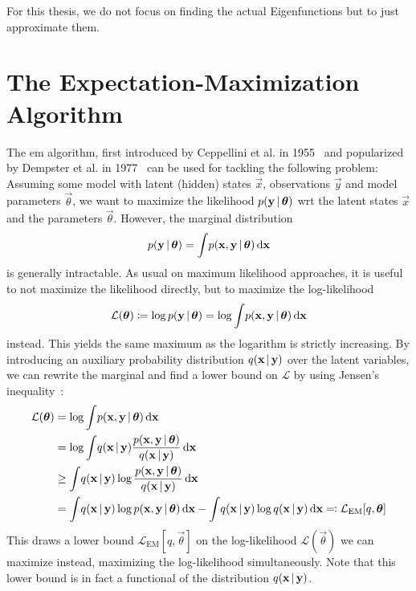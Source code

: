 	For this thesis, we do not focus on finding the actual Eigenfunctions but to just approximate them.

\section{The Expectation-Maximization Algorithm}
	The \ac{em} algorithm, first introduced by Ceppellini et al. in 1955~\cite{ceppelliniEstimationGeneFrequencies1955} and popularized by Dempster et al. in 1977~\cite{dempsterMaximumLikelihoodIncomplete1977a} can be used for tackling the following problem: Assuming some model with latent (hidden) states \(\vec{x}\), observations \(\vec{y}\) and model parameters \(\vec{\theta}\), we want to maximize the likelihood \( p(\boldsymbol{\mathrm{y}} \,\vert\, \boldsymbol{\mathrm{\theta}}) \) \ac{wrt} the latent states \(\vec{x}\) and the parameters \(\vec{\theta}\). However, the marginal distribution
	\begin{align*}
		p(\boldsymbol{\mathrm{y}} \,\vert\, \boldsymbol{\mathrm{\theta}}) = \int\! p(\boldsymbol{\mathrm{x}}, \boldsymbol{\mathrm{y}} \,\vert\, \boldsymbol{\mathrm{\theta}}) \dd{\boldsymbol{\mathrm{x}}}
	\end{align*}
	is generally intractable. As usual on maximum likelihood approaches, it is useful to not maximize the likelihood directly, but to maximize the log-likelihood
	\begin{align*}
		\mathcal{L}(\boldsymbol{\mathrm{\theta}}) \coloneqq \log p(\boldsymbol{\mathrm{y}} \,\vert\, \boldsymbol{\mathrm{\theta}}) = \log \int\! p(\boldsymbol{\mathrm{x}}, \boldsymbol{\mathrm{y}} \,\vert\, \boldsymbol{\mathrm{\theta}}) \dd{\boldsymbol{\mathrm{x}}}
	\end{align*}
	instead. This yields the same maximum as the logarithm is strictly increasing. By introducing an auxiliary probability distribution \( q(\boldsymbol{\mathrm{x}} \,\vert\, \boldsymbol{\mathrm{y}}) \) over the latent variables, we can rewrite the marginal and find a lower bound on \(\mathcal{L}\) by using Jensen's inequality~\cite{jensenFonctionsConvexesInegalites1906}:
	\begin{align}
		\mathcal{L}(\boldsymbol{\mathrm{\theta}})
			&= \log \int\! p(\boldsymbol{\mathrm{x}}, \boldsymbol{\mathrm{y}} \,\vert\, \boldsymbol{\mathrm{\theta}}) \dd{\boldsymbol{\mathrm{x}}}  \nonumber \\
			&= \log \int\! q(\boldsymbol{\mathrm{x}} \,\vert\, \boldsymbol{\mathrm{y}}) \frac{p(\boldsymbol{\mathrm{x}}, \boldsymbol{\mathrm{y}} \,\vert\, \boldsymbol{\mathrm{\theta}})}{q(\boldsymbol{\mathrm{x}} \,\vert\, \boldsymbol{\mathrm{y}})} \dd{\boldsymbol{\mathrm{x}}}  \nonumber \\
			&\geq \int\! q(\boldsymbol{\mathrm{x}} \,\vert\, \boldsymbol{\mathrm{y}}) \log \frac{p(\boldsymbol{\mathrm{x}}, \boldsymbol{\mathrm{y}} \,\vert\, \boldsymbol{\mathrm{\theta}})}{q(\boldsymbol{\mathrm{x}} \,\vert\, \boldsymbol{\mathrm{y}})} \dd{\boldsymbol{\mathrm{x}}}  \nonumber \\
			&= \int\! q(\boldsymbol{\mathrm{x}} \,\vert\, \boldsymbol{\mathrm{y}}) \log p(\boldsymbol{\mathrm{x}}, \boldsymbol{\mathrm{y}} \,\vert\, \boldsymbol{\mathrm{\theta}}) \dd{\boldsymbol{\mathrm{x}}} - \int\! q(\boldsymbol{\mathrm{x}} \,\vert\, \boldsymbol{\mathrm{y}}) \log q(\boldsymbol{\mathrm{x}} \,\vert\, \boldsymbol{\mathrm{y}}) \dd{\boldsymbol{\mathrm{x}}} \eqqcolon \mathcal{L}_\mathrm{EM}[q, \boldsymbol{\mathrm{\theta}}]  \label{eq:emLowerBound}
	\end{align}
	This draws a lower bound \( \mathcal{L}_\mathrm{EM}[q, \vec{\theta}] \) on the log-likelihood \( \mathcal{L}(\vec{\theta}) \) we can maximize instead, maximizing the log-likelihood simultaneously. Note that this lower bound is in fact a functional of the distribution \( q(\boldsymbol{\mathrm{x}} \,\vert\, \boldsymbol{\mathrm{y}}) \).

